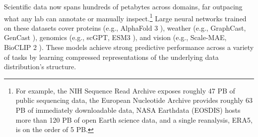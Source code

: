 \documentclass[runningheads]{llncs}
\begin{document}
Scientific data now spans hundreds of petabytes across domains, far outpacing what any lab can annotate or manually inspect.\footnote{For example, the NIH Sequence Read Archive exposes roughly \num{47} PB of public sequencing data, the European Nucleotide Archive provides roughly \num{63} PB of immediately downloadable data, NASA Earthdata (EOSDIS) hosts more than \num{120} PB of open Earth science data, and a single reanalysis, ERA5, is on the order of \num{5} PB.}
Large neural networks trained on these datasets cover proteins (e.g., AlphaFold 3 \citep{abramson2024alphafold3}), weather (e.g., GraphCast, GenCast \citep{lam2023graphcast,price2025gencast}), genomics (e.g., scGPT, ESM3 \citep{cui2024scgpt,hayes2025esm3}), and vision (e.g., Scale-MAE, BioCLIP 2 \citep{reed2023scale,gu2025bioclip2}).
These models achieve strong predictive performance across a variety of tasks by learning compressed representations of the underlying data distribution's structure.
\end{document}
